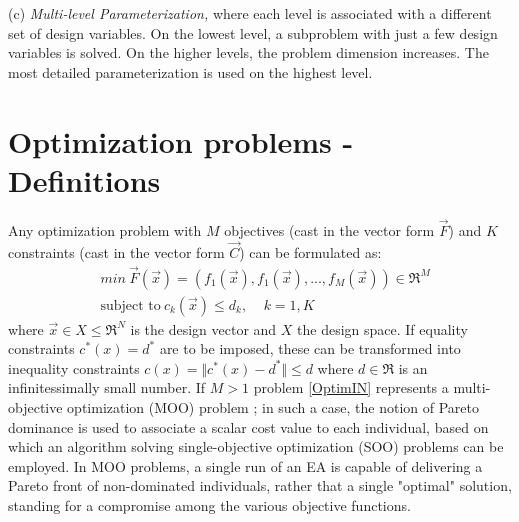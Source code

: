 (c) \emph{Multi-level Parameterization,} where each level is
associated with a different set of design variables. On the lowest
level, a subproblem with just a few design variables is solved. On
the higher levels, the problem dimension increases. The most detailed parameterization is used on the highest level.



\section{Optimization problems - Definitions}
Any optimization problem with $M$ objectives (cast in the vector form $\vec{F}$) and $K$ constraints (cast in the vector form $\vec{C}$) can be formulated as:
\begin{align} 
   &min ~ \vec{F}(\vec{x})=(f_1(\vec{x}),f_1(\vec{x}),...,f_M(\vec{x}))\in \Re^{M} \nonumber \\
   &\mbox{subject to} ~ c_k(\vec{x})\leq d_k, ~~~~~ k =1,K
\label{OptimIN}
\end{align}
where $\vec{x}\in X \!\leq\! \Re^{N}$ is the design vector and $X$ the design space. If equality constraints $ c^*(x)=d^* $ are to be imposed, these can be transformed into inequality constraints $ c(x)=\Vert c^*(x)-d^*\Vert \leq d $ where $ d \in \Re $ is an infinitessimally small number. If $M \!> \!1$ problem \ref{OptimIN} represents a multi-objective optimization (MOO) problem ; in such a case, the notion of Pareto dominance \cite{Zitzler2000} is used to associate a scalar cost value to each individual, based on which an algorithm solving single-objective optimization (SOO) problems can be employed. In MOO problems, a single run of an EA is capable of delivering a Pareto front of non-dominated individuals, rather that a single "optimal" solution, standing for a compromise among the various objective functions. 

